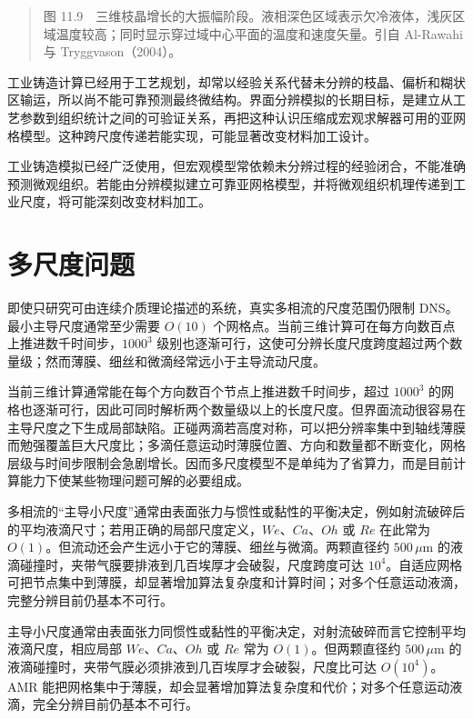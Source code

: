 \documentclass[11pt,a4paper,openany,fontset=none]{ctexbook}
\begin{document}
\begin{quote}\small 图 11.9　三维枝晶增长的大振幅阶段。液相深色区域表示欠冷液体，浅灰区域温度较高；同时显示穿过域中心平面的温度和速度矢量。引自 Al-Rawahi 与 Tryggvason（2004）。\end{quote}
工业铸造计算已经用于工艺规划，却常以经验关系代替未分辨的枝晶、偏析和糊状区输运，所以尚不能可靠预测最终微结构。界面分辨模拟的长期目标，是建立从工艺参数到组织统计之间的可验证关系，再把这种认识压缩成宏观求解器可用的亚网格模型。这种跨尺度传递若能实现，可能显著改变材料加工设计。

工业铸造模拟已经广泛使用，但宏观模型常依赖未分辨过程的经验闭合，不能准确预测微观组织。若能由分辨模拟建立可靠亚网格模型，并将微观组织机理传递到工业尺度，将可能深刻改变材料加工。

\section{多尺度问题}

即使只研究可由连续介质理论描述的系统，真实多相流的尺度范围仍限制 DNS。最小主导尺度通常至少需要 $O(10)$ 个网格点。当前三维计算可在每方向数百点上推进数千时间步，$1000^3$ 级别也逐渐可行，这使可分辨长度尺度跨度超过两个数量级；然而薄膜、细丝和微滴经常远小于主导流动尺度。

当前三维计算通常能在每个方向数百个节点上推进数千时间步，超过 $1000^3$ 的网格也逐渐可行，因此可同时解析两个数量级以上的长度尺度。但界面流动很容易在主导尺度之下生成局部缺陷。正碰两滴若高度对称，可以把分辨率集中到轴线薄膜而勉强覆盖巨大尺度比；多滴任意运动时薄膜位置、方向和数量都不断变化，网格层级与时间步限制会急剧增长。因而多尺度模型不是单纯为了省算力，而是目前计算能力下使某些物理问题可解的必要组成。

多相流的“主导小尺度”通常由表面张力与惯性或黏性的平衡决定，例如射流破碎后的平均液滴尺寸；若用正确的局部尺度定义，$We$、$Ca$、$Oh$ 或 $Re$ 在此常为 $O(1)$。但流动还会产生远小于它的薄膜、细丝与微滴。两颗直径约 $500\,\mu\mathrm m$ 的液滴碰撞时，夹带气膜要排液到几百埃厚才会破裂，尺度跨度可达 $10^4$。自适应网格可把节点集中到薄膜，却显著增加算法复杂度和计算时间；对多个任意运动液滴，完整分辨目前仍基本不可行。

主导小尺度通常由表面张力同惯性或黏性的平衡决定，对射流破碎而言它控制平均液滴尺度，相应局部 $We$、$Ca$、$Oh$ 或 $Re$ 常为 $O(1)$。但两颗直径约 $500\,\mu\mathrm m$ 的液滴碰撞时，夹带气膜必须排液到几百埃厚才会破裂，尺度比可达 $O(10^4)$。AMR 能把网格集中于薄膜，却会显著增加算法复杂度和代价；对多个任意运动液滴，完全分辨目前仍基本不可行。
\end{document}
